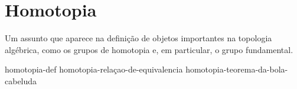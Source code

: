 \section{Homotopia}
\label{homotopia}
Um assunto que aparece na definição de objetos importantes na topologia algébrica, como os grupos de homotopia e, em particular, o grupo fundamental.

{homotopia-def}%
{homotopia-relaçao-de-equivalencia}
{homotopia-teorema-da-bola-cabeluda}                                